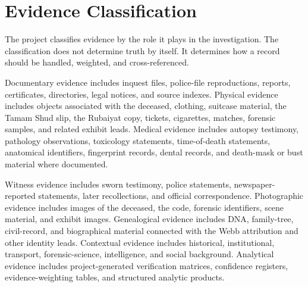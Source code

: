 \section{Evidence Classification}

The project classifies evidence by the role it plays in the investigation. The classification does not determine truth by itself. It determines how a record should be handled, weighted, and cross-referenced.

Documentary evidence includes inquest files, police-file reproductions, reports, certificates, directories, legal notices, and source indexes. Physical evidence includes objects associated with the deceased, clothing, suitcase material, the Tamam Shud slip, the Rubaiyat copy, tickets, cigarettes, matches, forensic samples, and related exhibit leads. Medical evidence includes autopsy testimony, pathology observations, toxicology statements, time-of-death statements, anatomical identifiers, fingerprint records, dental records, and death-mask or bust material where documented.

Witness evidence includes sworn testimony, police statements, newspaper-reported statements, later recollections, and official correspondence. Photographic evidence includes images of the deceased, the code, forensic identifiers, scene material, and exhibit images. Genealogical evidence includes DNA, family-tree, civil-record, and biographical material connected with the Webb attribution and other identity leads. Contextual evidence includes historical, institutional, transport, forensic-science, intelligence, and social background. Analytical evidence includes project-generated verification matrices, confidence registers, evidence-weighting tables, and structured analytic products.

